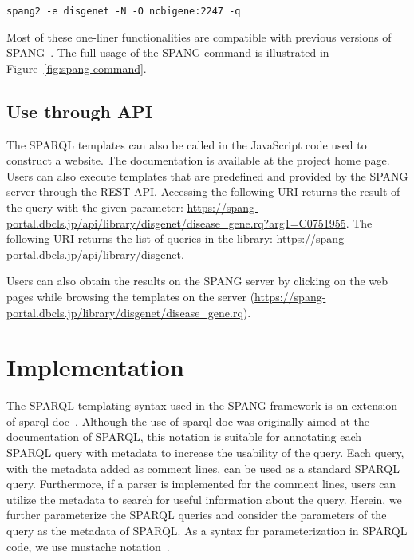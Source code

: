 \documentclass[runningheads]{llncs}
\begin{document}
\texttt{spang2 -e disgenet -N -O ncbigene:2247 -q}

\noindent Most of these one-liner functionalities are compatible with previous versions of SPANG~\cite{spang}. The full usage of the SPANG command is illustrated in Figure~\ref{fig:spang-command}.



\subsection{Use through API}

The SPARQL templates can also be called in the JavaScript code used to construct a website. The documentation is available at %
the project home page.
Users can also execute templates that are predefined and provided by the SPANG server through the REST API.
Accessing the following URI returns the result of the query with the given parameter:
\url{https://spang-portal.dbcls.jp/api/library/disgenet/disease_gene.rq?arg1=C0751955}. The following URI returns the list of queries in the library: \url{https://spang-portal.dbcls.jp/api/library/disgenet}.


Users can also obtain the results on the SPANG server by clicking on the web pages while browsing the templates on the server (\url{https://spang-portal.dbcls.jp/library/disgenet/disease_gene.rq}). 


\section{Implementation}

The SPARQL templating syntax used in the SPANG framework is an extension of sparql-doc~\cite{sparql-doc}. Although the use of sparql-doc was originally aimed at the documentation of SPARQL, this notation is suitable for annotating each SPARQL query with metadata to increase the usability of the query. Each query, with the metadata added as comment lines, can be used as a standard SPARQL query. Furthermore, if a parser is implemented for the comment lines, users can utilize the metadata to search for useful information about the query.
Herein, we further parameterize the SPARQL queries and consider the parameters of the query as the metadata of SPARQL.
As a syntax for parameterization in SPARQL code, we use mustache notation~\cite{mustache}.
\end{document}
